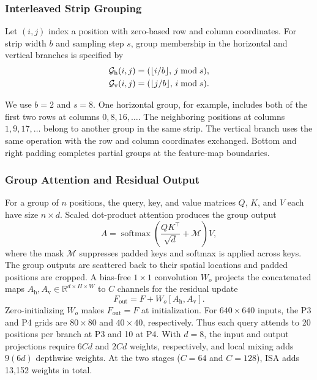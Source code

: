 \documentclass[lettersize,journal]{IEEEtran}
\begin{document}
\begin{samepage}
\subsubsection{Interleaved Strip Grouping}
Let $(i,j)$ index a position with zero-based row and column coordinates. For strip width $b$ and sampling step $s$, group membership in the horizontal and vertical branches is specified by
\begin{align}
\mathcal{G}_{\mathrm{h}}(i,j) &= (\lfloor i/b\rfloor,\,j\bmod s),\notag\\
\mathcal{G}_{\mathrm{v}}(i,j) &= (\lfloor j/b\rfloor,\,i\bmod s).
\label{eq:isa-grouping}
\end{align}
\end{samepage}
\noindent We use $b=2$ and $s=8$. One horizontal group, for example, includes both of the first two rows at columns $0,8,16,\ldots$. The neighboring positions at columns $1,9,17,\ldots$ belong to another group in the same strip. The vertical branch uses the same operation with the row and column coordinates exchanged. Bottom and right padding completes partial groups at the feature-map boundaries.

\subsubsection{Group Attention and Residual Output}
For a group of $n$ positions, the query, key, and value matrices $Q$, $K$, and $V$ each have size $n\times d$. Scaled dot-product attention produces the group output
\begin{equation}
A=\operatorname{softmax}\!\left(\frac{QK^\top}{\sqrt{d}}+\mathcal{M}\right)V,
\label{eq:ribbon-attention}
\end{equation}
\noindent where the mask $\mathcal{M}$ suppresses padded keys and softmax is applied across keys. The group outputs are scattered back to their spatial locations and padded positions are cropped. A bias-free $1\times1$ convolution $W_o$ projects the concatenated maps $A_{\mathrm{h}},A_{\mathrm{v}}\in\mathbb{R}^{d\times H\times W}$ to $C$ channels for the residual update
\begin{equation}
F_{\mathrm{out}}=F+W_o[A_{\mathrm{h}},A_{\mathrm{v}}].
\label{eq:ribbon-residual}
\end{equation}
\noindent Zero-initializing $W_o$ makes $F_{\mathrm{out}}=F$ at initialization. For $640\times640$ inputs, the P3 and P4 grids are $80\times80$ and $40\times40$, respectively. Thus each query attends to 20 positions per branch at P3 and 10 at P4. With $d=8$, the input and output projections require $6Cd$ and $2Cd$ weights, respectively, and local mixing adds $9(6d)$ depthwise weights. At the two stages ($C=64$ and $C=128$), ISA adds 13,152 weights in total.
\end{document}
